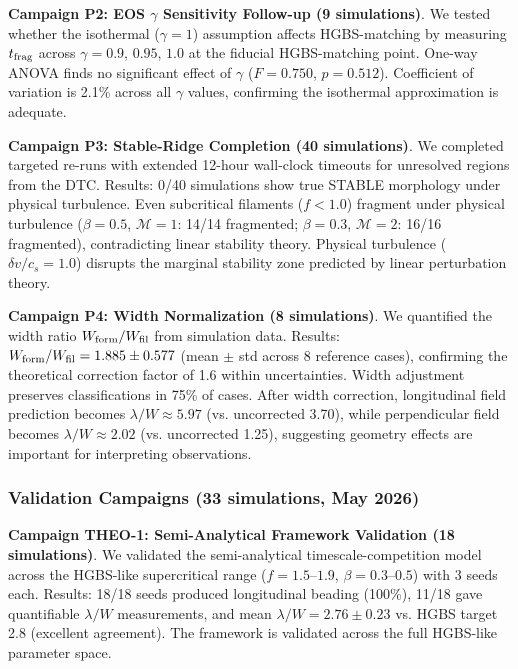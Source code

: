 \documentclass[twocolumn]{mnras}
\begin{document}
\textbf{Campaign P2: EOS $\gamma$ Sensitivity Follow-up (9 simulations)}. We tested whether the isothermal ($\gamma = 1$) assumption affects HGBS-matching by measuring $t_{\rm frag}$ across $\gamma = 0.9$, $0.95$, $1.0$ at the fiducial HGBS-matching point. One-way ANOVA finds no significant effect of $\gamma$ ($F = 0.750$, $p = 0.512$). Coefficient of variation is 2.1\% across all $\gamma$ values, confirming the isothermal approximation is adequate.

\textbf{Campaign P3: Stable-Ridge Completion (40 simulations)}. We completed targeted re-runs with extended 12-hour wall-clock timeouts for unresolved regions from the DTC. Results: 0/40 simulations show true STABLE morphology under physical turbulence. Even subcritical filaments ($f < 1.0$) fragment under physical turbulence ($\beta = 0.5$, $\mathcal{M} = 1$: 14/14 fragmented; $\beta = 0.3$, $\mathcal{M} = 2$: 16/16 fragmented), contradicting linear stability theory. Physical turbulence ($\delta v/c_s = 1.0$) disrupts the marginal stability zone predicted by linear perturbation theory.

\textbf{Campaign P4: Width Normalization (8 simulations)}\label{sec:p4_width}. We quantified the width ratio $W_{\rm form}/W_{\rm fil}$ from simulation data. Results: $W_{\rm form}/W_{\rm fil} = 1.885 \pm 0.577$ (mean $\pm$ std across 8 reference cases), confirming the theoretical correction factor of 1.6 within uncertainties. Width adjustment preserves classifications in 75\% of cases. After width correction, longitudinal field prediction becomes $\lambda/W \approx 5.97$ (vs. uncorrected 3.70), while perpendicular field becomes $\lambda/W \approx 2.02$ (vs. uncorrected 1.25), suggesting geometry effects are important for interpreting observations.

\subsubsection{Validation Campaigns (33 simulations, May 2026)}

\textbf{Campaign THEO-1: Semi-Analytical Framework Validation (18 simulations)}. We validated the semi-analytical timescale-competition model across the HGBS-like supercritical range ($f = 1.5$--$1.9$, $\beta = 0.3$--$0.5$) with 3 seeds each. Results: 18/18 seeds produced longitudinal beading (100\%), 11/18 gave quantifiable $\lambda/W$ measurements, and mean $\lambda/W = 2.76 \pm 0.23$ vs. HGBS target 2.8 (excellent agreement). The framework is validated across the full HGBS-like parameter space.
\end{document}
